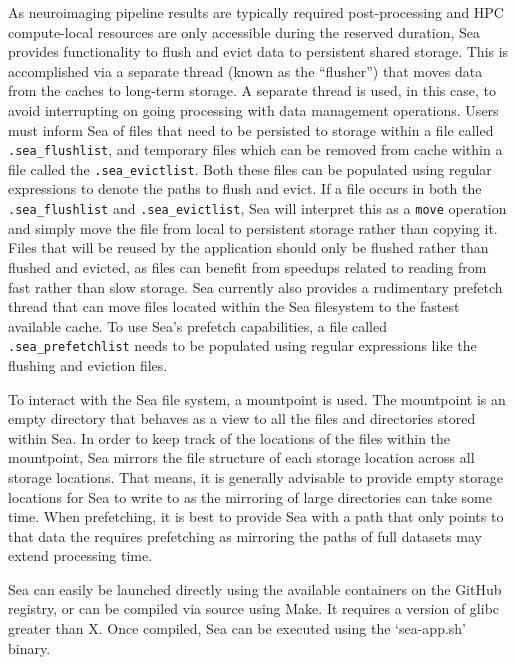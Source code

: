     As neuroimaging pipeline results are typically required post-processing and HPC compute-local resources are only accessible during the
    reserved duration, Sea provides functionality to flush and evict data to persistent shared storage. This is accomplished via a separate
    thread (known as the ``flusher'') that moves data from the caches to long-term storage. A separate thread is used, in this case, to avoid
    interrupting on going processing with data management operations.
    Users must inform Sea of files that need to be
    persisted to storage within a file called \texttt{.sea\_flushlist}, and temporary files which can be removed from cache within a file
    called the \texttt{.sea\_evictlist}. Both these files can be populated using regular expressions to denote the paths to flush and evict.
    If a file occurs in both the \texttt{.sea\_flushlist} and \texttt{.sea\_evictlist}, Sea will interpret this as a \texttt{move} operation
    and simply move the file from local to persistent storage rather than copying it. Files that will be reused by the application should only
    be flushed rather than flushed and evicted, as files can benefit from speedups related to reading from fast rather than slow storage.
    Sea currently also provides a rudimentary prefetch thread that can move files located within the Sea filesystem to the fastest available cache.
    To use Sea's prefetch capabilities, a file called \texttt{.sea\_prefetchlist} needs to be populated using regular expressions like the
    flushing and eviction files.
    
    To interact with the Sea file system, a mountpoint is used. The mountpoint is an empty directory that behaves as a view to
    all the files and directories stored within Sea. In order to keep track of the locations of the files within the mountpoint, Sea
    mirrors the file structure of each storage location across all storage locations. That means, it is generally advisable to provide
    empty storage locations for Sea to write to as the mirroring of large directories can take some time. When prefetching, it is
    best to provide Sea with a path that only points to that data the requires prefetching as mirroring the paths of full datasets may 
    extend processing time.
    
    Sea can easily be launched directly using the available containers on the GitHub registry, or can be compiled via source using Make.
    It requires a version of glibc greater than X. Once compiled, Sea can be executed using the `sea-app.sh' binary.
    
